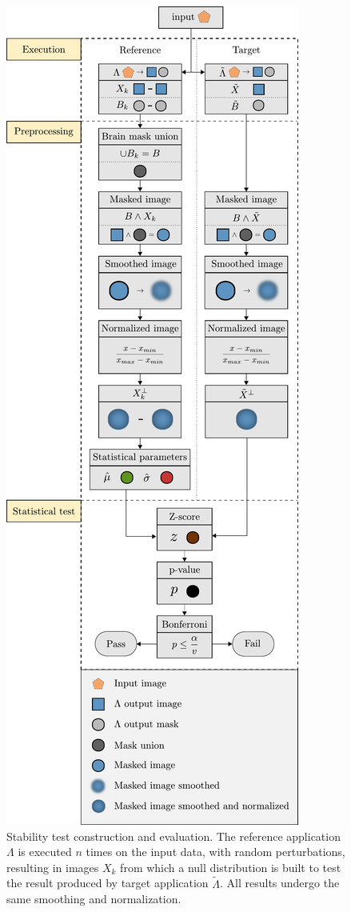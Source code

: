 \documentclass[lettersize,journal]{IEEEtran}
\begin{document}
\begin{figure}
    \centering
    \includegraphics[width=\columnwidth]{figures/workflow_V.pdf}
    \caption{Stability test construction and evaluation. The reference application $\Lambda$ is executed $n$ times on the input data, with random perturbations, resulting in images $X_k$ from which a null distribution is built to test the result produced by target application $\tilde \Lambda$. All results undergo the same smoothing and normalization.}
    \label{fig:test_workflow}
\end{figure}
\end{document}
